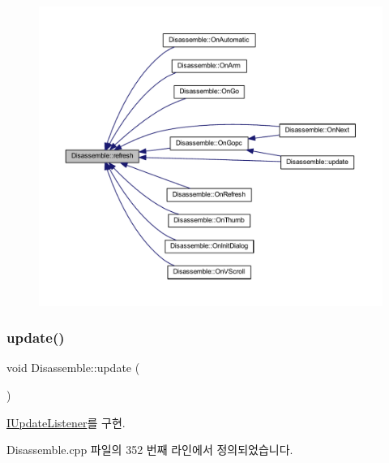 \begin{figure}[H]
\begin{center}
\leavevmode
\includegraphics[width=350pt]{class_disassemble_a7cdf11d53ce0f170ad7dd8fc66961805_icgraph}
\end{center}
\end{figure}
\mbox{\label{class_disassemble_a30fc26e4204bd886f7cd8eb0c6c22e88}} 
\subsubsection{\texorpdfstring{update()}{update()}}
{\footnotesize\ttfamily void Disassemble\+::update (\begin{DoxyParamCaption}{ }\end{DoxyParamCaption})\hspace{0.3cm}{\ttfamily [virtual]}}



\mbox{\hyperlink{class_i_update_listener_ac03b85f52e858d0bbd08a4984b2cb929}{I\+Update\+Listener}}를 구현.



Disassemble.\+cpp 파일의 352 번째 라인에서 정의되었습니다.


